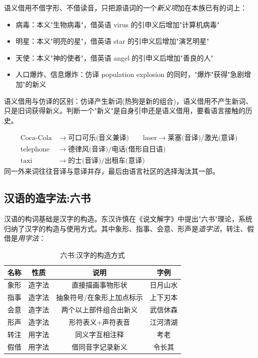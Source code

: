 语义借用不借字形、不借读音，只把源语词的一个\emph{新义项}加在本族已有的词上：
\begin{itemize}
    \item 病毒：本义"生物病毒"，借英语 virus 的引申义后增加"计算机病毒"
    \item 明星：本义"明亮的星"，借英语 star 的引申义后增加"演艺明星"
    \item 天使：本义"神的使者"，借英语 angel 的引申义后增加"善良的人"
    \item 人口爆炸、信息爆炸：仿译 population explosion 的同时，"爆炸"获得"急剧增加"的新义
\end{itemize}

语义借用与仿译的区别：仿译产生新词(热狗是新的组合)，语义借用不产生新词、只是旧词获得新义。判断一个"新义"是自身引申还是语义借用，要看语言接触的历史。

\begin{example}[同一外来概念可有不同吸收方式]
\begin{align}
    \text{Coca-Cola} &\rightarrow \text{可口可乐(音义兼译)} \qquad \text{laser} \rightarrow \text{莱塞(音译)} / \text{激光(意译)} \\
    \text{telephone} &\rightarrow \text{德律风(音译)} / \text{电话(借形自日语)} \\
    \text{taxi} &\rightarrow \text{的士(音译)} / \text{出租车(意译)}
\end{align}
同一外来词往往音译与意译并存，最后由语言社区的选择淘汰其一部。
\end{example}

\subsection{汉语的造字法:六书}

汉语的构词基础是汉字的构造。东汉许慎在《说文解字》中提出"六书"理论，系统归纳了汉字的构造与使用方式。其中象形、指事、会意、形声是\emph{造字法}，转注、假借是\emph{用字法}：

\begin{table}[H]
\centering
\caption{六书:汉字的构造方式}
\begin{tabulary}{\textwidth}{@{}CCCC@{}}
\toprule
\textbf{名称} & \textbf{性质} & \textbf{说明} & \textbf{字例} \\
\midrule
象形 & 造字法 & 直接描画事物形状 & 日月山水 \\
指事 & 造字法 & 抽象符号/在象形上加点标示 & 上下刃本 \\
会意 & 造字法 & 两个以上部件组合出新义 & 武信休森 \\
形声 & 造字法 & 形符表义+声符表音 & 江河清湖 \\
转注 & 用字法 & 同义字互相注释 & 考老 \\
假借 & 用字法 & 借同音字记录新义 & 令长其 \\
\bottomrule
\end{tabulary}
\end{table}

